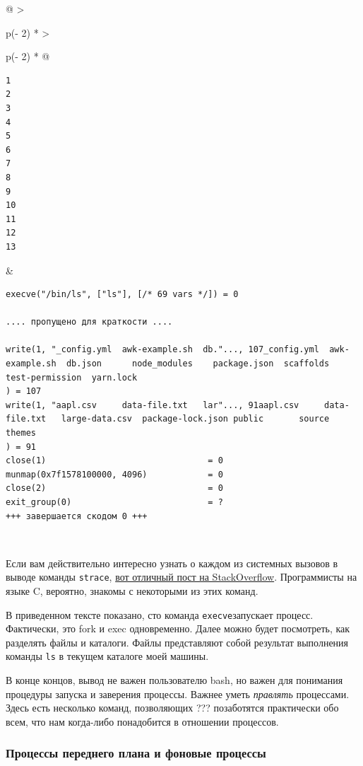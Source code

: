 \documentclass{article}
\begin{document}
\begin{longtable}[]{@{}
  >{\raggedright\arraybackslash}p{(\columnwidth - 2\tabcolsep) * }
  >{\raggedright\arraybackslash}p{(\columnwidth - 2\tabcolsep) * }@{}}
\toprule
\endhead
\begin{minipage}[t]{\linewidth}\raggedright
\begin{verbatim}
1
2
3
4
5
6
7
8
9
10
11
12
13
\end{verbatim}
\end{minipage} & \begin{minipage}[t]{\linewidth}\raggedright
\begin{verbatim}
execve("/bin/ls", ["ls"], [/* 69 vars */]) = 0

.... пропущено для краткости ....

write(1, "_config.yml  awk-example.sh  db."..., 107_config.yml  awk-example.sh  db.json      node_modules    package.json  scaffolds  test-permission  yarn.lock
) = 107
write(1, "aapl.csv     data-file.txt   lar"..., 91aapl.csv     data-file.txt   large-data.csv  package-lock.json public       source    themes
) = 91
close(1)                                = 0
munmap(0x7f1578100000, 4096)            = 0
close(2)                                = 0
exit_group(0)                           = ?
+++ завершается скодом 0 +++
\end{verbatim}
\end{minipage} \\ \addlinespace
\bottomrule
\end{longtable}

Если вам действительно интересно узнать о каждом из системных вызовов в
выводе команды \texttt{strace},
\href{https://stackoverflow.com/a/6334557}{вот отличный пост на
StackOverflow}. Программисты на языке C, вероятно, знакомы с некоторыми
из этих команд.

В приведенном тексте показано, сто команда \texttt{execve}запускает
процесс. Фактически, это fork и exec одновременно. Далее можно будет
посмотреть, как разделять файлы и каталоги. Файлы представляют собой
результат выполнения команды \texttt{ls} в текущем каталоге моей машины.

В конце концов, вывод не важен пользователю bash, но важен для понимания
процедуры запуска и заверения процессы. Важнее уметь \emph{правлять}
процессами. Здесь есть несколько команд, позволяющих ??? позаботятся
практически обо всем, что нам когда-либо понадобится в отношении
процессов.

\hypertarget{Foreground-vs-Background-Processes}{%
\subsubsection{\texorpdfstring{\protect\hyperlink{Foreground-vs-Background-Processes}{}Процессы
переднего плана и фоновые
процессы}{Процессы переднего плана и фоновые процессы}}\label{Foreground-vs-Background-Processes}}
\end{document}
